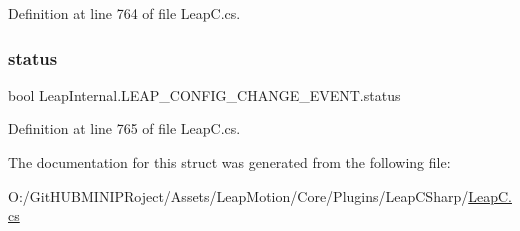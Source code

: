 Definition at line 764 of file Leap\+C.\+cs.

\mbox{\label{struct_leap_internal_1_1_l_e_a_p___c_o_n_f_i_g___c_h_a_n_g_e___e_v_e_n_t_a5ad350acad44f5a2ec4ba055e8e9dd07}} 
\subsubsection{\texorpdfstring{status}{status}}
{\footnotesize\ttfamily bool Leap\+Internal.\+L\+E\+A\+P\+\_\+\+C\+O\+N\+F\+I\+G\+\_\+\+C\+H\+A\+N\+G\+E\+\_\+\+E\+V\+E\+N\+T.\+status}



Definition at line 765 of file Leap\+C.\+cs.



The documentation for this struct was generated from the following file\+:\begin{DoxyCompactItemize}
\item 
O\+:/\+Git\+H\+U\+B\+M\+I\+N\+I\+P\+Roject/\+Assets/\+Leap\+Motion/\+Core/\+Plugins/\+Leap\+C\+Sharp/\mbox{\hyperlink{_leap_c_8cs}{Leap\+C.\+cs}}\end{DoxyCompactItemize}
